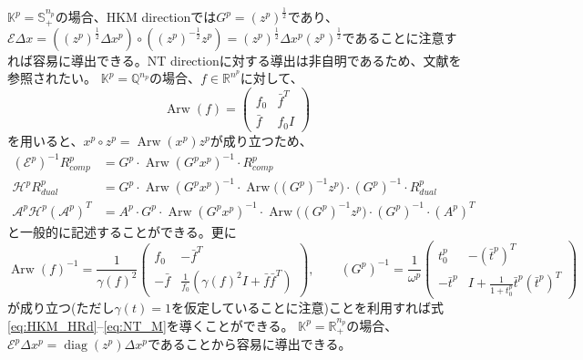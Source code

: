\documentclass{jsarticle}
\begin{document}
$\mathbb{K}^p=\mathbb{S}_+^{n_p}$の場合、HKM directionでは$G^p=(z^p)^\frac{1}{2}$であり、$\mathcal{E}\Delta x = ((z^p)^\frac{1}{2}\Delta x^p)\circ ((z^p)^{-\frac{1}{2}}z^p)=(z^p)^\frac{1}{2} \Delta x^p (z^p)^\frac{1}{2}$であることに注意すれば容易に導出できる。NT directionに対する導出は非自明であるため、文献\cite{todd1998}を参照されたい。
$\mathbb{K}^p=\mathbb{Q}^{n_p}$の場合、$f\in \mathbb{R}^{n^p}$に対して、 %
\begin{equation}
    \operatorname{Arw}(f) = 
    \left(
    \begin{array}{cc}
        f_0 & \bar{f}^T \\
        \bar{f} & f_0 I
    \end{array}
    \right)
\end{equation}
を用いると、$x^p \circ z^p = \operatorname{Arw}(x^p)z^p$が成り立つため、
\begin{align*}
    (\mathcal{E}^p)^{-1}R^p_{comp} &= G^p \cdot \operatorname{Arw}(G^p x^p)^{-1} \cdot R^p_{comp}\\
    \mathcal{H}^p R^p_{dual} &= G^p \cdot \operatorname{Arw}(G^p x^p)^{-1} \cdot \operatorname{Arw}\big((G^p)^{-1} z^p\big) \cdot(G^p)^{-1} \cdot R^p_{dual}\\
    \mathcal{A}^p\mathcal{H}^p(\mathcal{A}^p)^T &= A^p \cdot G^p \cdot \operatorname{Arw}(G^p x^p)^{-1} \cdot \operatorname{Arw}\big((G^p)^{-1} z^p\big) \cdot(G^p)^{-1} \cdot (A^p)^T
\end{align*}
と一般的に記述することができる。更に
\begin{equation*}
    \operatorname{Arw}(f)^{-1} = \frac{1}{\gamma(f)^2} \left(\begin{array}{cc}
        f_0 & -\bar{f}^T \\
        -\bar{f} & \frac{1}{f_0}(\gamma(f)^2 I + \bar{f}\bar{f}^T)
    \end{array}\right),
    \qquad
    (G^p)^{-1} = \frac{1}{\omega^p} \begin{pmatrix}
        t^p_0 & -(\bar{t}^p)^T \\
        -\bar{t}^p & I+\frac{1}{1 + t^p_0} \bar{t}^p(\bar{t}^p)^T
    \end{pmatrix}
\end{equation*}
が成り立つ(ただし$\gamma(t)=1$を仮定していることに注意)ことを利用すれば式\eqref{eq:HKM_HRd}--\eqref{eq:NT_M}を導くことができる。
$\mathbb{K}^p=\mathbb{R}^{n_p}_+$の場合、$\mathcal{E}^p \Delta x^p = \operatorname{diag}(z^p) \Delta x^p$であることから容易に導出できる。



\end{document}

